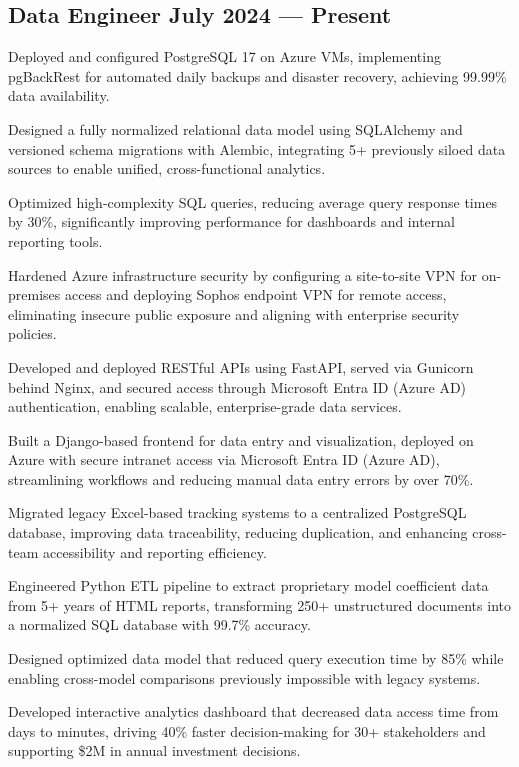 \subsection{{Data Engineer  \hfill July 2024 --- Present}}
\begin{zitemize}
\item Deployed and configured PostgreSQL 17 on Azure VMs, implementing pgBackRest for automated daily backups and disaster recovery, achieving 99.99\% data availability.
\item Designed a fully normalized relational data model using SQLAlchemy and versioned schema migrations with Alembic, integrating 5+ previously siloed data sources to enable unified, cross-functional analytics.
\item Optimized high-complexity SQL queries, reducing average query response times by 30\%, significantly improving performance for dashboards and internal reporting tools.
\item Hardened Azure infrastructure security by configuring a site-to-site VPN for on-premises access and deploying Sophos endpoint VPN for remote access, eliminating insecure public exposure and aligning with enterprise security policies.
\item Developed and deployed RESTful APIs using FastAPI, served via Gunicorn behind Nginx, and secured access through Microsoft Entra ID (Azure AD) authentication, enabling scalable, enterprise-grade data services.
\item Built a Django-based frontend for data entry and visualization, deployed on Azure with secure intranet access via Microsoft Entra ID (Azure AD), streamlining workflows and reducing manual data entry errors by over 70\%.
\item Migrated legacy Excel-based tracking systems to a centralized PostgreSQL database, improving data traceability, reducing duplication, and enhancing cross-team accessibility and reporting efficiency.
\item Engineered Python ETL pipeline to extract proprietary model coefficient data from 5+ years of HTML reports, transforming 250+ unstructured documents into a normalized SQL database with 99.7\% accuracy.
\item Designed optimized data model that reduced query execution time by 85\% while enabling cross-model comparisons previously impossible with legacy systems.
\item Developed interactive analytics dashboard that decreased data access time from days to minutes, driving 40\% faster decision-making for 30+ stakeholders and supporting \$2M in annual investment decisions.
\end{zitemize}

